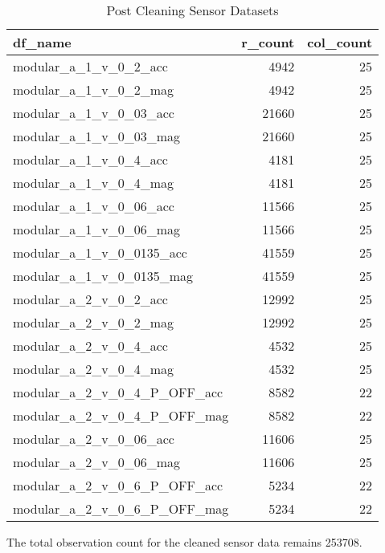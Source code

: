 \documentclass[]{article}
\begin{document}
\begin{table}[!h]

\caption{\label{tab:sensorfiledetails-post}Post Cleaning Sensor Datasets}
\centering
\begin{tabular}[t]{l|r|r}
\hline
df\_name & r\_count & col\_count\\
\hline
modular\_a\_1\_v\_0\_2\_acc & 4942 & 25\\
\hline
modular\_a\_1\_v\_0\_2\_mag & 4942 & 25\\
\hline
modular\_a\_1\_v\_0\_03\_acc & 21660 & 25\\
\hline
modular\_a\_1\_v\_0\_03\_mag & 21660 & 25\\
\hline
modular\_a\_1\_v\_0\_4\_acc & 4181 & 25\\
\hline
modular\_a\_1\_v\_0\_4\_mag & 4181 & 25\\
\hline
modular\_a\_1\_v\_0\_06\_acc & 11566 & 25\\
\hline
modular\_a\_1\_v\_0\_06\_mag & 11566 & 25\\
\hline
modular\_a\_1\_v\_0\_0135\_acc & 41559 & 25\\
\hline
modular\_a\_1\_v\_0\_0135\_mag & 41559 & 25\\
\hline
modular\_a\_2\_v\_0\_2\_acc & 12992 & 25\\
\hline
modular\_a\_2\_v\_0\_2\_mag & 12992 & 25\\
\hline
modular\_a\_2\_v\_0\_4\_acc & 4532 & 25\\
\hline
modular\_a\_2\_v\_0\_4\_mag & 4532 & 25\\
\hline
modular\_a\_2\_v\_0\_4\_P\_OFF\_acc & 8582 & 22\\
\hline
modular\_a\_2\_v\_0\_4\_P\_OFF\_mag & 8582 & 22\\
\hline
modular\_a\_2\_v\_0\_06\_acc & 11606 & 25\\
\hline
modular\_a\_2\_v\_0\_06\_mag & 11606 & 25\\
\hline
modular\_a\_2\_v\_0\_6\_P\_OFF\_acc & 5234 & 22\\
\hline
modular\_a\_2\_v\_0\_6\_P\_OFF\_mag & 5234 & 22\\
\hline
\end{tabular}
\end{table}

The total observation count for the cleaned sensor data remains 253708.
\end{document}
